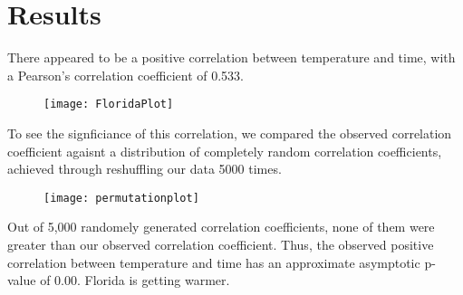 \documentclass[11pt]{article}
\begin{document}
\section{Results}
        There appeared to be a positive correlation between temperature and time, with a 
        Pearson's correlation coefficient of 0.533. 
        \begin{figure}[h]
        \begin{center}
            \texttt{[image: FloridaPlot]}
            \label{fig}
        \end{center}
        \end{figure}

        To see the signficiance of this correlation, we compared the observed correlation
        coefficient agaisnt a distribution of completely random correlation coefficients, 
        achieved through reshuffling our data 5000 times. 
        
        \begin{figure}[ht]
        \begin{center}
            \texttt{[image: permutationplot]}
        \end{center}
        \end{figure}

        Out of 5,000 randomely generated correlation coefficients, none of them were 
        greater than our observed correlation coefficient.
        Thus, the observed positive correlation between temperature and time has an 
        approximate asymptotic p-value of 0.00.
        Florida is getting warmer. 
\end{document}
